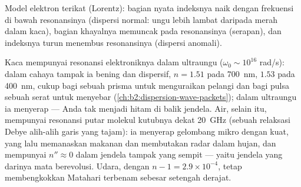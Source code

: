 \begin{omfigure}

{\small Model elektron terikat (Lorentz): bagian nyata indeksnya
naik dengan frekuensi di bawah resonansinya (dispersi normal: ungu
lebih lambat daripada merah dalam kaca), bagian khayalnya memuncak pada
resonansinya (serapan), dan indeksnya turun menembus resonansinya
(dispersi anomali).}
\end{omfigure}

\begin{example}\label{ex:b2:waves-in-media:dielectrics}
Kaca mempunyai resonansi elektroniknya dalam ultraungu ($\omega_0 \sim 10^{16}$
rad/s): dalam cahaya tampak ia bening dan dispersif, $n = 1.51$ pada
\qty{700}{nm}, $1.53$ pada \qty{400}{nm}, cukup bagi sebuah prisma untuk menguraikan
pelangi dan bagi pulsa sebuah serat untuk menyebar (\cref{ch:b2:dispersion-wave-packets});
dalam ultraungu ia menyerap --- Anda tak menjadi hitam di balik jendela.
Air, selain itu, mempunyai resonansi putar molekul kutubnya dekat
\qty{20}{GHz} (sebuah relaksasi Debye alih-alih garis yang tajam): ia menyerap
gelombang mikro dengan kuat, yang lalu memanaskan makanan dan membutakan radar dalam hujan,
dan mempunyai $n'' \approx 0$ dalam jendela tampak yang sempit --- yaitu jendela yang
darinya mata berevolusi. Udara, dengan $n - 1 = 2.9 \times 10^{-4}$, tetap membengkokkan
Matahari terbenam sebesar setengah derajat.
\end{example}


